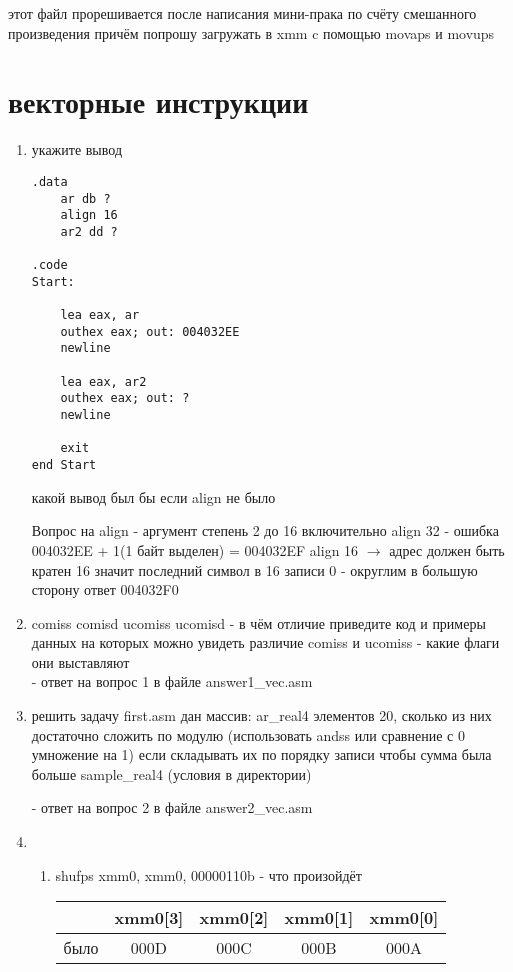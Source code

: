 \documentclass[a4paper,10pt]{article}
\begin{document}
этот файл прорешивается после написания мини-прака по счёту смешанного произведения причём попрошу загружать в xmm c помощью movaps и movups
\section*{векторные инструкции}
\begin{enumerate}
    \item укажите вывод
\begin{verbatim}
.data
    ar db ?
    align 16
    ar2 dd ?

.code
Start:
    
    lea eax, ar
    outhex eax; out: 004032EE
    newline

    lea eax, ar2 
    outhex eax; out: ?
    newline

    exit
end Start
\end{verbatim}
какой вывод был бы если align не было\par
Вопрос на align - аргумент степень 2 до 16 включительно align 32 - ошибка \\
004032EE + 1(1 байт выделен) = 004032EF align 16 $\rightarrow$ адрес должен быть кратен 16 значит последний символ в 16 записи 0 - округлим в большую сторону ответ 004032F0 \\
    \item comiss comisd ucomiss ucomisd - в чём отличие приведите код и примеры данных на которых можно увидеть различие comiss и ucomiss - какие флаги они выставляют  \\ - ответ на вопрос 1 в файле answer1\_vec.asm
    \item решить задачу first.asm дан массив: ar\_real4 элементов 20, сколько из них достаточно сложить по модулю (использовать andss или сравнение с 0 умножение на 1) если складывать их по порядку записи чтобы сумма была больше sample\_real4 (условия в директории) \par
    - ответ на вопрос 2 в файле answer2\_vec.asm
    \item 
    \begin{enumerate}
        \item shufps xmm0, xmm0, 00000110b - что произойдёт \\
        \begin{tabular}{|c|c|c|c|c|}
            \hline
             & xmm0[3] & xmm0[2] & xmm0[1] & xmm0[0] \\
             \hline
            было &  000D & 000C & 000B & 000A \\
            \hline

\end{tabular}
\end{enumerate}
\end{enumerate}
\end{document}
